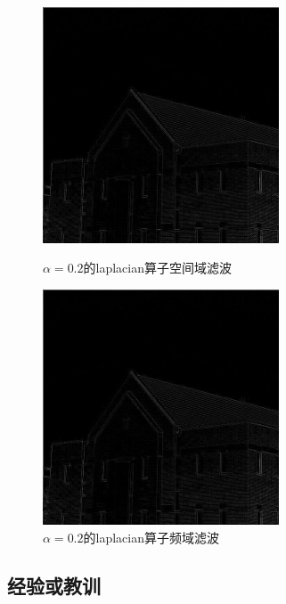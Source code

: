\documentclass[11pt, a4paper, UTF8]{ctexart}
\begin{document}
  \begin{figure}[H]
    \centering
    \begin{minipage}[t]{0.48\textwidth}
    \centering
    \includegraphics[width=7cm]{laplacian_space.jpg}
    \caption{$\alpha=0.2$的laplacian算子空间域滤波}
    \end{minipage}
    \begin{minipage}[t]{0.48\textwidth}
    \centering
    \includegraphics[width=7cm]{laplacian_freq.jpg}
    \caption{$\alpha=0.2$的laplacian算子频域滤波}
    \end{minipage}
  \end{figure}





\subsection{经验或教训}
\end{document}
